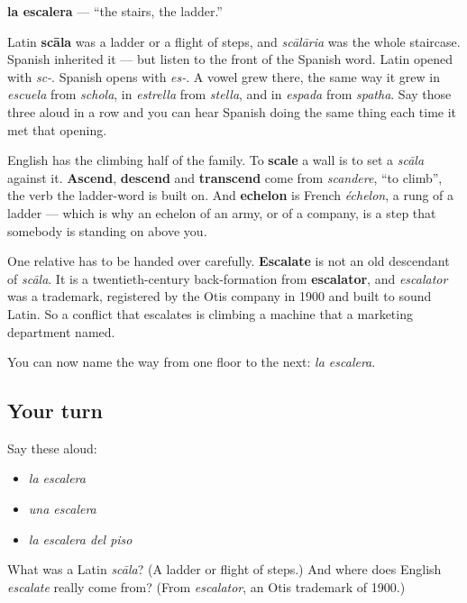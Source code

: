\begin{cousinweb}
\textbf{la escalera} — \textquotedblleft{}the stairs, the ladder.\textquotedblright{}

Latin \textbf{scāla} was a ladder or a flight of steps, and \emph{scālāria} was the whole staircase. Spanish inherited it — but listen to the front of the Spanish word. Latin opened with \emph{sc-}. Spanish opens with \emph{es-}. A vowel grew there, the same way it grew in \emph{escuela} from \emph{schola}, in \emph{estrella} from \emph{stella}, and in \emph{espada} from \emph{spatha}. Say those three aloud in a row and you can hear Spanish doing the same thing each time it met that opening.

English has the climbing half of the family. To \textbf{scale} a wall is to set a \emph{scāla} against it. \textbf{Ascend}, \textbf{descend} and \textbf{transcend} come from \emph{scandere}, \textquotedblleft{}to climb\textquotedblright{}, the verb the ladder-word is built on. And \textbf{echelon} is French \emph{échelon}, a rung of a ladder — which is why an echelon of an army, or of a company, is a step that somebody is standing on above you.

One relative has to be handed over carefully. \textbf{Escalate} is not an old descendant of \emph{scāla}. It is a twentieth-century back-formation from \textbf{escalator}, and \emph{escalator} was a trademark, registered by the Otis company in 1900 and built to sound Latin. So a conflict that escalates is climbing a machine that a marketing department named.
\end{cousinweb}

\begin{grammarlens}[title={What you've built}]
You can now name the way from one floor to the next: \emph{la escalera}.
\end{grammarlens}

\subsection*{Your turn}
Say these aloud:

\begin{itemize}
\raggedright
  \item \emph{la escalera}
  \item \emph{una escalera}
  \item \emph{la escalera del piso}
\end{itemize}

\begin{tcolorbox}[breakable,colback=teal!4,colframe=teal!35!black,title={Before you move on}]
What was a Latin \emph{scāla}? (A ladder or flight of steps.) And where does English \emph{escalate} really come from? (From \emph{escalator}, an Otis trademark of 1900.)
\end{tcolorbox}
